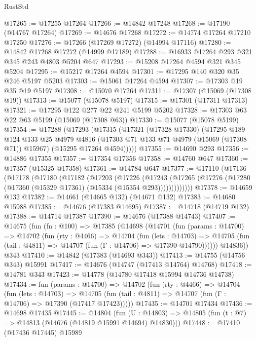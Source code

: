\begin{lexlean}{RustStd}
\begin{coremodule}
@17265 := @17255 @17264
@17266 := @14842 @17248
@17268 := @17190 (@14767 @17264)
@17269 := @14676 @17268
@17272 := @14774 @17264 @17210 @17250
@17276 := @17266 (@17269 @17272) (@14994 @17116)
@17280 := @14842 @17268 @17272 (@14999 @17189)
@17288 := @16933 @17264 @293 @321 @345 @243 @4803 @5204 @647
@17293 := @15208 @17264 @4594 @321 @345 @5204
@17295 := @15217 @17264 @4594
@17301 := @17295 @140 @320 @35 @246 @5197 @5203
@17303 := @15061 @17264 @4594
@17307 := @17303 @19 @35 @19 @5197
@17308 := @15070 @17264
@17311 := @17307 (@15069 (@17308 @19))
@17313 := @15077 (@15078 @5197)
@17315 := @17301 (@17311 @17313)
@17321 := @17295 @122 @277 @22 @241 @5199 @5202
@17328 := @17303 @63 @22 @63 @5199 (@15069 (@17308 @63))
@17330 := @15077 (@15078 @5199)
@17354 := @17288
    (@17293
      (@17315
        (@17321
          (@17328 @17330)
          (@17295
            @189
            @124
            @133
            @25
            @4979
            @4816
            (@17303 @71 @133 @71 @4979 (@15069 (@17308 @71)) @15967)
            (@15295 @17264 @4594)))))
@17355 := @14690 @293
@17356 := @14886 @17355
@17357 := @17354 @17356
@17358 := @14760 @647
@17360 := @17357 (@15325 @17358)
@17361 := @14784 @647
@17377 := @17110
    (@17136
      (@17178
        (@17180
          (@17182
            (@17203
              (@17226
                (@17243
                  (@17265 (@17276 (@17280 (@17360 (@15329 @17361) (@15334 (@15354 @293)))))))))))))
@17378 := @14659 @132
@17382 := @14661 (@14665 @132) (@14671 @132)
@17383 := @14680 @15988
@17385 := @14676 (@17383 @14695)
@17387 := @14718 (@14719 @132)
@17388 := @14714 @17387
@17390 := @14676 (@17388 @14743)
@17407 := @14675
    (fun (fn : @100) =>
    @17385
      (@14698
        (@14701
          (fun (params : @14700) =>
          @14702
            (fun (rty : @4466) =>
            @14704
              (fun (lets : @14703) =>
              @14705 (fun (tail : @4811) => @14707 (fun (Γ : @14706) => @17390 @14790))))))
        @14836))
    @343
@17410 := @14842 (@17383 (@14693 @343))
@17413 := @14755 (@14756 @343) @15991
@17417 := @14676 (@14747 (@17413 @14764) @14768)
@17418 := @14781 @343
@17423 := @14778 (@14780 @17418 @15994 @14736 @14738)
@17434 := fun (params : @14700) =>
  @14702
    (fun (rty : @4466) =>
    @14704
      (fun (lets : @14703) =>
      @14705 (fun (tail : @4811) => @14707 (fun (Γ : @14706) => @17390 (@17417 @17423)))))
@17435 := @14701 @17434
@17436 := @14698 @17435
@17445 := @14804
    (fun (U : @14803) => @14805 (fun (t : @7) => @14813 (@14676 (@14819 @15991 @14694) @14830)))
@17448 := @17410 (@17436 @17445) @15989

\end{coremodule}
\end{lexlean}
